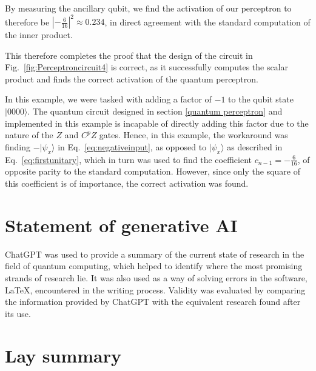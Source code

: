 \documentclass[twocolumn,superscriptaddress]{revtex4-1}
\begin{document}
By measuring the ancillary qubit, we find the activation of our perceptron to therefore be $|-\frac{6}{16}|^2 \approx 0.234$, in direct agreement with the standard computation of the inner product. 

This therefore completes the proof that the design of the circuit in Fig.~\ref{fig:Perceptroncircuit4} is correct, as it successfully computes the scalar product and finds the correct activation of the quantum perceptron.

In this example, we were tasked with adding a factor of $-1$ to the qubit state $|0000 \rangle$. The quantum circuit designed in section \ref{quantum perceptron} and implemented in this example is incapable of directly adding this factor due to the nature of the $Z$ and $C^pZ$ gates. Hence, in this example, the workaround was finding $-|\psi_{x} \rangle$ in Eq.~\ref{eq:negativeinput}, as opposed to $|\psi_{x} \rangle$ as described in Eq.~\ref{eq:firstunitary}, which in turn was used to find the coefficient $c_{n-1} = -\frac{6}{16}$, of opposite parity to the standard computation. However, since only the square of this coefficient is of importance, the correct activation was found.



\section*{Statement of generative AI}
ChatGPT was used to provide a summary of the current state of research in the field of quantum computing, which helped to identify where the most promising strands of research lie. It was also used as a way of solving errors in the software, LaTeX, encountered in the writing process. Validity was evaluated by comparing the information provided by ChatGPT with the equivalent research found after its use.

\newpage

\onecolumngrid
\section*{Lay summary}
\end{document}
